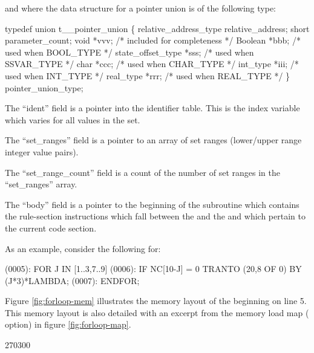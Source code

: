 and where the data structure for a pointer union is of the following type:
\begin{codeexample}
typedef union t__pointer_union
   \{
     relative_address_type relative_address;
     short parameter_count;
     void *vvv;               /* included for completeness */
     Boolean *bbb;            /* used when BOOL_TYPE */
     state_offset_type *sss;  /* used when SSVAR_TYPE */
     char *ccc;               /* used when CHAR_TYPE */
     int_type *iii;           /* used when INT_TYPE */
     real_type *rrr;          /* used when REAL_TYPE */
   \} pointer_union_type;
\end{codeexample}



The ``ident'' field is a pointer into the identifier table.   This is the
index variable which varies for all values in the set.

The ``set\_ranges'' field is a pointer to an array of set ranges (lower/upper
range integer value pairs).

The ``set\_range\_count'' field is a count of the number of set ranges in
the ``set\_ranges'' array.

The ``body'' field is a pointer to the beginning of the subroutine which
contains the rule-section instructions which fall between the  and
the  and which pertain to the current code section.


As an example, consider the following for:
\begin{logfileexample}
(0005): FOR J IN [1..3,7..9]
(0006):     IF NC[10-J] = 0 TRANTO (20,8 OF 0) BY (J*3)*LAMBDA;
(0007): ENDFOR;
\end{logfileexample}

Figure \ref{fig:forloop-mem} illustrates the memory layout of the 
beginning on line 5.   This memory layout is also detailed with an excerpt
from the memory load
map ( option) in figure \ref{fig:forloop-map}.


\startfig
\begin{fast_picture}{270}{300}
\nextAbox{}
                  \nextAbox{}
                                \nextDbox{}
                                \nextDbox{}
                  \nextAbox{}
                  \nextAbox{}
                                \nextDbox{}
                                      \nextEbox{}
   \nextEbox{}
   \nextEbox{}
\end{fast_picture}

